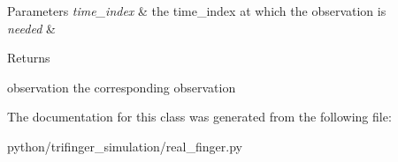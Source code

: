\begin{DoxyParams}{Parameters}
{\em time\+\_\+index} & the time\+\_\+index at which the observation is \\
\hline
{\em needed} & \\
\hline
\end{DoxyParams}
\begin{DoxyReturn}{Returns}


observation the corresponding observation 
\end{DoxyReturn}


The documentation for this class was generated from the following file\+:\begin{DoxyCompactItemize}
\item 
python/trifinger\+\_\+simulation/real\+\_\+finger.\+py\end{DoxyCompactItemize}
